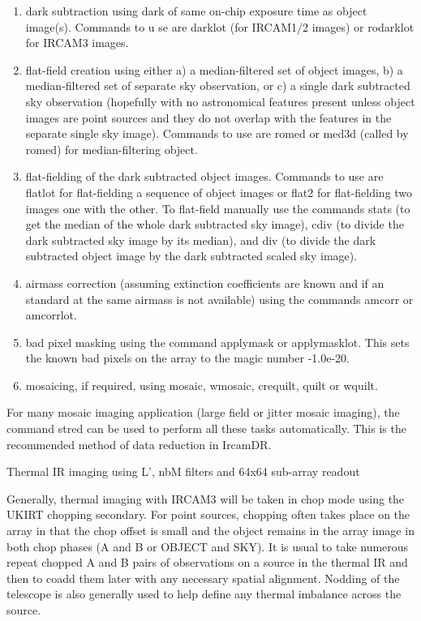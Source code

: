 \begin{enumerate}

\item dark subtraction using dark of same on-chip exposure time as object
image(s). Commands to u
se are darklot (for {\sc IRCAM1/2} images) or rodarklot
for {\sc IRCAM3} images.
 
\item flat-field creation using either a) a median-filtered set of object
images, b) a median-filtered set of separate sky observation, or c) a
single dark subtracted sky observation (hopefully with no astronomical
features present unless object images are point sources and they do not
overlap with the features in the separate single sky image).  Commands to
use are romed or med3d (called by romed) for median-filtering object.
 
\item flat-fielding of the dark subtracted object images. Commands to use
are flatlot for flat-fielding a sequence of object images or flat2 for
flat-fielding two images one with the other.  To flat-field manually use
the commands stats (to get the median of the whole dark subtracted sky
image), cdiv (to divide the dark subtracted sky image by its median), and
div (to divide the dark subtracted object image by the dark subtracted 
scaled sky image).  
 
\item airmass correction (assuming extinction coefficients are known and
if an standard at the same airmass is not available) using the commands
amcorr or amcorrlot.
 
\item bad pixel masking using the command applymask or applymasklot.  This
sets the known bad pixels on the array to the magic number -1.0e-20.
 
\item mosaicing, if required, using mosaic, wmosaic, crequilt, quilt or
wquilt. 
 
\end{enumerate}

For many mosaic imaging application (large field or jitter mosaic
imaging), the command stred can be used to perform all these tasks
automatically.  This is the recommended method of data reduction in
IrcamDR.
 
Thermal IR imaging using L', nbM filters and 64x64 sub-array readout
 
Generally, thermal imaging with {\sc IRCAM3} will be taken in chop mode using
the {\sc UKIRT} chopping secondary.  For point sources, chopping often takes
place on the array in that the chop offset is small and the object
remains in the array image in both chop phases (A and B or OBJECT and
SKY).  It is usual to take numerous repeat chopped A and B pairs of
observations on a source in the thermal IR and then to coadd them later
with any necessary spatial alignment.  Nodding of the telescope is also
generally used to help define any thermal imbalance across the source.
 
